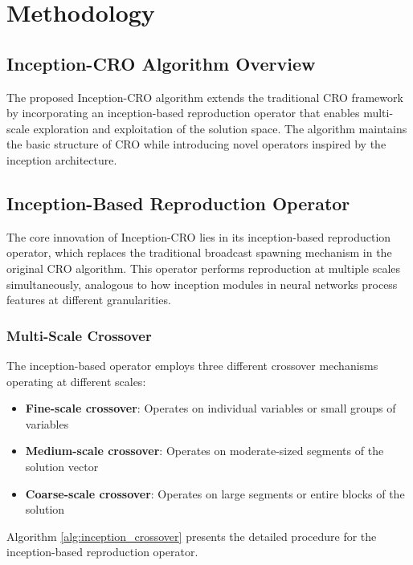 \section{Methodology}
\label{sec:methodology}

\subsection{Inception-CRO Algorithm Overview}

The proposed Inception-CRO algorithm extends the traditional CRO framework by incorporating an inception-based reproduction operator that enables multi-scale exploration and exploitation of the solution space. The algorithm maintains the basic structure of CRO while introducing novel operators inspired by the inception architecture.

\subsection{Inception-Based Reproduction Operator}

The core innovation of Inception-CRO lies in its inception-based reproduction operator, which replaces the traditional broadcast spawning mechanism in the original CRO algorithm. This operator performs reproduction at multiple scales simultaneously, analogous to how inception modules in neural networks process features at different granularities.

\subsubsection{Multi-Scale Crossover}

The inception-based operator employs three different crossover mechanisms operating at different scales:

\begin{itemize}
    \item \textbf{Fine-scale crossover}: Operates on individual variables or small groups of variables
    \item \textbf{Medium-scale crossover}: Operates on moderate-sized segments of the solution vector
    \item \textbf{Coarse-scale crossover}: Operates on large segments or entire blocks of the solution
\end{itemize}

Algorithm \ref{alg:inception_crossover} presents the detailed procedure for the inception-based reproduction operator.

